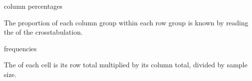 \documentclass[t]{beamer}
\begin{document}
	\begin{frame}[t]{ column percentages}
	
	
	The proportion of each column group within each row group is known by reading the  of the crosstabulation.
	
	\end{frame}

	\begin{frame}[t]{ frequencies}
	
	
	The  of each cell is its row total multiplied by its column total, divided by sample size.

	\end{frame}
	
\end{document}
